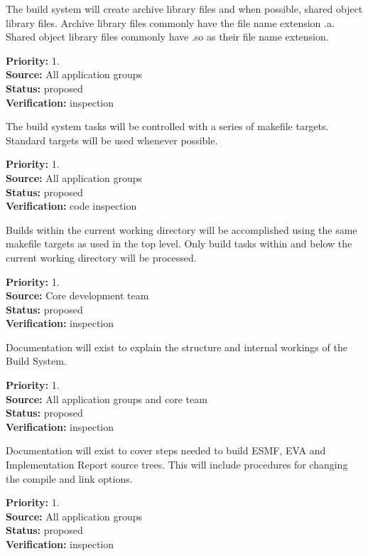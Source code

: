 

The build system will create archive library files and when
possible, shared object library files. Archive library files commonly
have the file name extension .a.  Shared object library files commonly
have .so as their file name extension.
\begin{reqlist}
{\bf Priority:} 1. \\
{\bf Source:} All application groups \\
{\bf Status:}  proposed \\
{\bf Verification:} inspection
\end{reqlist}

The build system tasks will be controlled with a series of
makefile targets. Standard targets will be used whenever 
possible. 

\begin{reqlist}
{\bf Priority:} 1. \\
{\bf Source:} All application groups \\
{\bf Status:} proposed \\
{\bf Verification:} code inspection
\end{reqlist}

Builds within the current working directory will be
accomplished using the same makefile targets as
used in the top level.
Only build tasks within and below the current working directory
will be processed.  
\begin{reqlist}
{\bf Priority:} 1. \\
{\bf Source:} Core development team \\
{\bf Status:} proposed \\
{\bf Verification:} inspection
\end{reqlist}

Documentation will exist to explain the structure and 
internal workings of the Build System.
\begin{reqlist}
{\bf Priority:} 1. \\
{\bf Source:} All application groups and core team \\
{\bf Status:} proposed \\
{\bf Verification:} inspection
\end{reqlist}

Documentation will exist to cover steps needed to build ESMF,
EVA and Implementation Report  source trees.  This will include 
procedures for changing the compile and link options.
\begin{reqlist}
{\bf Priority:} 1. \\
{\bf Source:} All application groups \\
{\bf Status:} proposed \\
{\bf Verification:} inspection
\end{reqlist}

